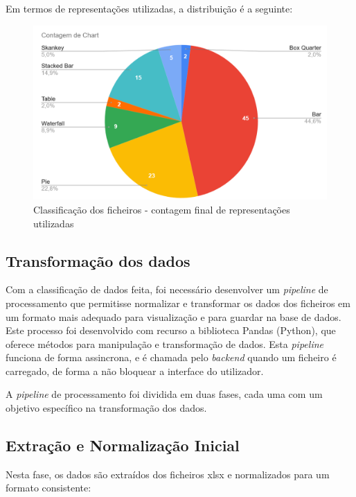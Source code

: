 Em termos de representações utilizadas, a distribuição é a seguinte:
\begin{figure}[h]
    \centering
    \includegraphics[max width=\textwidth]{./img/stats2}
 \caption{Classificação dos ficheiros - contagem final de representações utilizadas}
 \end{figure}

\subsection{Transformação dos dados}

Com a classificação de dados feita, foi necessário desenvolver um \textit{pipeline} de processamento que permitisse normalizar e transformar os dados dos ficheiros em um formato mais adequado para visualização e para guardar na base de dados. Este processo foi desenvolvido com recurso a biblioteca Pandas (Python), que oferece métodos para manipulação e transformação de dados. Esta \textit{pipeline} funciona de forma assincrona, e é chamada pelo \textit{backend} quando um ficheiro é carregado, de forma a não bloquear a interface do utilizador.

A \textit{pipeline} de processamento foi dividida em duas fases, cada uma com um objetivo específico na transformação dos dados.

\subsection{Extração e Normalização Inicial}

Nesta fase, os dados são extraídos dos ficheiros \gls{xlsx} e normalizados para um formato consistente:

